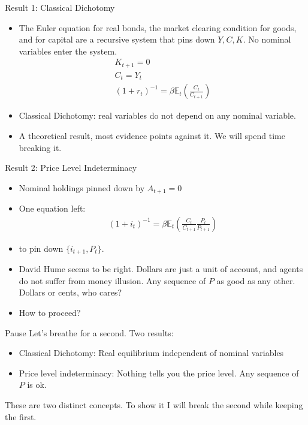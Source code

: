 \documentclass[11pt,aspectratio=169,xcolor={dvipsnames},hyperref={pdftex,pdfpagemode=UseNone,hidelinks,pdfdisplaydoctitle=true},usepdftitle=false]{beamer}
\begin{document}
\begin{frame}{Result 1: Classical Dichotomy}
\begin{itemize}
\item The Euler equation for real bonds, the market clearing condition for goods, and for capital are a recursive system that pins down $Y, C,K$. No nominal variables enter the system.
\begin{align*}
K_{t+1} = 0\\
C_t = Y_t \\
(1+r_t)^{-1} =\beta \mathbb{E}_t \left(\frac{C_t}{C_{t+1}}\right) 
\end{align*}
\item Classical Dichotomy: real variables do not depend on any nominal variable.
\item A theoretical result, most evidence points against it. We will spend time breaking it.
\end{itemize}
\end{frame}


\begin{frame}{Result 2: Price Level Indeterminacy}
\begin{itemize}
\item Nominal holdings pinned down by $A_{t+1} = 0$
\item One equation left:
\begin{align*}
(1+i_t)^{-1} = \beta \mathbb{E}_t \left(\frac{C_t}{C_{t+1}} \frac{P_t}{P_{t+1}}\right)
\end{align*}
\item to pin down  $\{i_{t+1},P_t\}$.
\item David Hume seems to be right. Dollars are just a unit of account, and agents do not suffer from money illusion. Any sequence of $P$ as good as any other. Dollars or cents, who cares?
\item How to proceed?
\end{itemize}
\end{frame}


\begin{frame}{Pause}
Let's breathe for a second. Two results:
\begin{itemize}
\item Classical Dichotomy: Real equilibrium independent of nominal variables
\item Price level indeterminacy: Nothing tells you the price level. Any sequence of $P$ is ok.
\end{itemize}
These are two distinct concepts. To show it I will break the second while keeping the first.
\end{frame}
\end{document}
